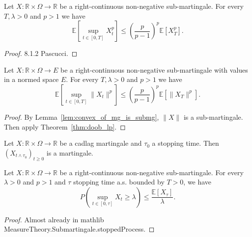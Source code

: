 \begin{theorem}\label{thm:doob_lp}
  Let $X:\mathbb{R}\times\Omega\rightarrow \mathbb{R}$ be a right-continuous non-negative sub-martingale.
  For every $T, \lambda>0$ and $p>1$ we have
  $$
  \mathbb{E}\left[ \sup_{t\in[0,T]}X_t^p \right]\leq \left(\frac{p}{p-1}\right)^p\mathbb{E}[X_T^p].
  $$
\end{theorem}
\begin{proof}
  8.1.2 Pascucci.
\end{proof}

\begin{corollary}\label{cor:doob_lp}
  Let $X : \mathbb{R}\times\Omega\rightarrow E$ be a right-continuous non-negative sub-martingale with values in a normed space $E$.
  For every $T, \lambda>0$ and $p>1$ we have
  $$
  \mathbb{E}\left[ \sup_{t\in[0,T]} \lVert X_t \rVert ^p \right]\leq \left(\frac{p}{p-1}\right)^p\mathbb{E}[\lVert X_T \rVert ^p].
  $$
\end{corollary}
\begin{proof}
  By Lemma~\ref{lem:convex_of_mg_is_submg}, $\lVert X \rVert$ is a sub-martingale.
  Then apply Theorem~\ref{thm:doob_lp}.
\end{proof}

\begin{lemma}\label{lem:stop_of_mg_is_mg}
  Let $X:\mathbb{R}\times\Omega\rightarrow \mathbb{R}$ be a cadlag martingale and $\tau_0$ a stopping time. Then $(X_{t\wedge\tau_0})_{t\geq 0}$ is a martingale.
\end{lemma}

\begin{lemma}\label{lem:doob_ineq_stop}
  Let $X:\mathbb{R}\times\Omega\rightarrow \mathbb{R}$ be a right-continuous non-negative sub-martingale.
  For every $\lambda>0$ and $p>1$ and $\tau$ stopping time a.s. bounded by $T>0$, we have
  $$
  P\left( \sup_{t\in[0,\tau]}X_t\geq\lambda \right)\leq \frac{\mathbb{E}[X_\tau]}{\lambda}.
  $$
\end{lemma}
\begin{proof}
  Almost already in mathlib MeasureTheory.Submartingale.stoppedProcess.
\end{proof}

